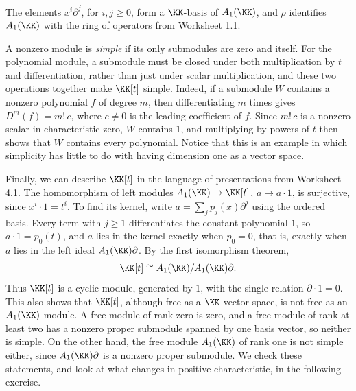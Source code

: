 \documentclass[12pt,reqno]{amsart}
\begin{document}
\begin{theorem}
The elements $x^i\partial^j$, for $i,j\geq0$, form a $\KK$-basis of $A_1(\KK)$, and $\rho$ identifies $A_1(\KK)$ with the ring of operators from Worksheet 1.1.
\end{theorem}

A nonzero module is \emph{simple} if its only submodules are zero and itself. For the polynomial module, a submodule must be closed under both multiplication by $t$ and differentiation, rather than just under scalar multiplication, and these two operations together make $\KK[t]$ simple. Indeed, if a submodule $W$ contains a nonzero polynomial $f$ of degree $m$, then differentiating $m$ times gives $D^m(f)=m!\,c$, where $c\neq0$ is the leading coefficient of $f$. Since $m!\,c$ is a nonzero scalar in characteristic zero, $W$ contains $1$, and multiplying by powers of $t$ then shows that $W$ contains every polynomial. Notice that this is an example in which simplicity has little to do with having dimension one as a vector space.

Finally, we can describe $\KK[t]$ in the language of presentations from Worksheet 4.1. The homomorphism of left modules $A_1(\KK)\to\KK[t]$, $a\mapsto a\cdot1$, is surjective, since $x^i\cdot1=t^i$. To find its kernel, write $a=\sum_jp_j(x)\partial^j$ using the ordered basis. Every term with $j\geq1$ differentiates the constant polynomial $1$, so $a\cdot1=p_0(t)$, and $a$ lies in the kernel exactly when $p_0=0$, that is, exactly when $a$ lies in the left ideal $A_1(\KK)\partial$. By the first isomorphism theorem,
\[
\KK[t]\cong A_1(\KK)/A_1(\KK)\partial.
\]
Thus $\KK[t]$ is a cyclic module, generated by $1$, with the single relation $\partial\cdot1=0$. This also shows that $\KK[t]$, although free as a $\KK$-vector space, is not free as an $A_1(\KK)$-module. A free module of rank zero is zero, and a free module of rank at least two has a nonzero proper submodule spanned by one basis vector, so neither is simple. On the other hand, the free module $A_1(\KK)$ of rank one is not simple either, since $A_1(\KK)\partial$ is a nonzero proper submodule. We check these statements, and look at what changes in positive characteristic, in the following exercise.

\hrulefill
\end{document}
